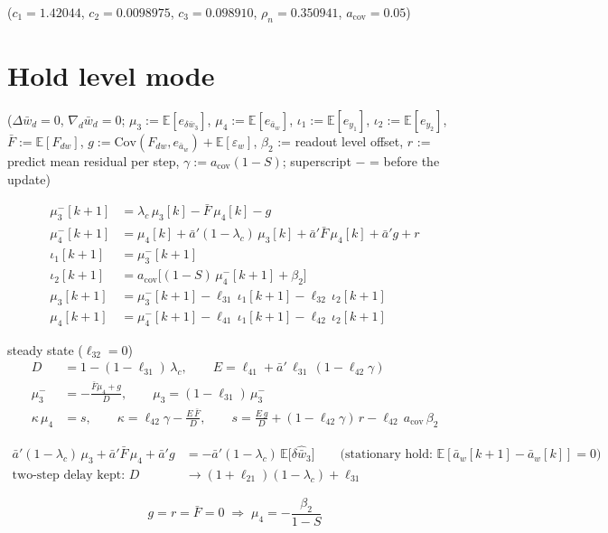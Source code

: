 \documentclass[11pt,a4paper,fontset=none]{ctexart}
\newcommand{\ba}{\bar{a}}
\newcommand{\bw}{\bar{w}}
\newcommand{\E}{\mathbb{E}}
\begin{document}
($c_1 = 1.42044$, $c_2 = 0.0098975$, $c_3 = 0.098910$, $\rho_n = 0.350941$,
$a_{\mathrm{cov}} = 0.05$)


\section*{Hold level mode}

($\Delta\bw_d = 0$, $\nabla_d\bw_d = 0$; $\mu_3 := \E[e_{\delta\bw_3}]$, $\mu_4 := \E[e_{\ba_w}]$,
$\iota_1 := \E[e_{y_1}]$, $\iota_2 := \E[e_{y_2}]$, $\bar{F} := \E[F_{dw}]$,
$g := \mathrm{Cov}(F_{dw}, e_{\ba_w}) + \E[\varepsilon_w]$, $\beta_2$ := readout level offset,
$r$ := predict mean residual per step, $\gamma := a_{\mathrm{cov}}(1-S)$; superscript $-$ = before the update)

\begin{align*}
\mu_3^{-}[k+1] &= \lambda_c\,\mu_3[k] - \bar{F}\,\mu_4[k] - g \\
\mu_4^{-}[k+1] &= \mu_4[k] + \ba'(1-\lambda_c)\,\mu_3[k] + \ba'\bar{F}\,\mu_4[k] + \ba' g + r \\
\iota_1[k+1] &= \mu_3^{-}[k+1] \\
\iota_2[k+1] &= a_{\mathrm{cov}}\bigl[(1-S)\,\mu_4^{-}[k+1] + \beta_2\bigr] \\
\mu_3[k+1] &= \mu_3^{-}[k+1] - \ell_{31}\,\iota_1[k+1] - \ell_{32}\,\iota_2[k+1] \\
\mu_4[k+1] &= \mu_4^{-}[k+1] - \ell_{41}\,\iota_1[k+1] - \ell_{42}\,\iota_2[k+1]
\end{align*}

steady state ($\ell_{32} = 0$)
\begin{align*}
D &= 1 - (1-\ell_{31})\,\lambda_c , \qquad
E = \ell_{41} + \ba'\,\ell_{31}\,(1 - \ell_{42}\gamma) \\
\mu_3^{-} &= -\frac{\bar{F}\mu_4 + g}{D} , \qquad \mu_3 = (1-\ell_{31})\,\mu_3^{-} \\
\kappa\,\mu_4 &= s , \qquad
\kappa = \ell_{42}\gamma - \frac{E\,\bar{F}}{D} , \qquad
s = \frac{E\,g}{D} + (1-\ell_{42}\gamma)\,r - \ell_{42}\,a_{\mathrm{cov}}\,\beta_2
\end{align*}

\begin{align*}
\ba'(1-\lambda_c)\,\mu_3 + \ba'\bar{F}\,\mu_4 + \ba' g &= -\ba'(1-\lambda_c)\,\E\bigl[\delta\hat{\bw}_3\bigr]
  \qquad \text{(stationary hold: } \E[\ba_w[k+1] - \ba_w[k]] = 0\text{)} \\
\text{two-step delay kept: } D &\to (1+\ell_{21})(1-\lambda_c) + \ell_{31}
\end{align*}

\begin{equation*}
g = r = \bar{F} = 0 \;\Rightarrow\; \mu_4 = -\frac{\beta_2}{1-S}
\end{equation*}
\end{document}
